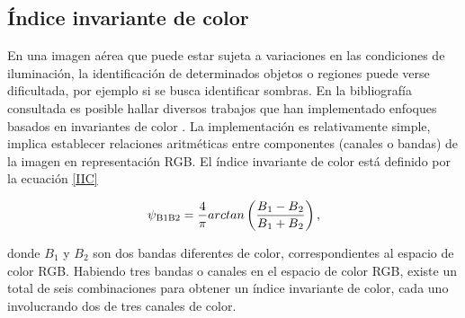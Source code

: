 \subsection{Índice invariante de color} \label{seccion iic}
En una imagen aérea que puede estar sujeta a variaciones en las condiciones de iluminación, la identificación de determinados objetos o regiones puede verse dificultada, por ejemplo si se busca identificar sombras. En la bibliografía consultada es posible hallar diversos trabajos que han implementado enfoques basados en invariantes de color \cite{gevers_pictoseek_2000, tsai_comparative_2006, singhal_automatic_2014, noauthor_using_nodate, sirmacek_building_2008, chang_unsupervised_nodate}. La implementación es relativamente simple, implica establecer relaciones aritméticas entre componentes (canales o bandas) de la imagen en representación RGB. El índice invariante de color está definido por la ecuación \ref{IIC} 


\begin{equation}
	\psi\textsubscript{B1B2}=\frac{4}{\pi} arctan\left(\frac{B\textsubscript{1}-B\textsubscript{2}}{B\textsubscript{1}+B\textsubscript{2}}\right),\label{IIC}
\end{equation}

 donde $B_1$ y $B_2$ son dos bandas diferentes de color, correspondientes al espacio de color RGB.
Habiendo tres bandas o canales en el espacio de color RGB, existe un total de seis combinaciones para obtener un índice invariante de color, cada uno involucrando dos de tres canales de color.